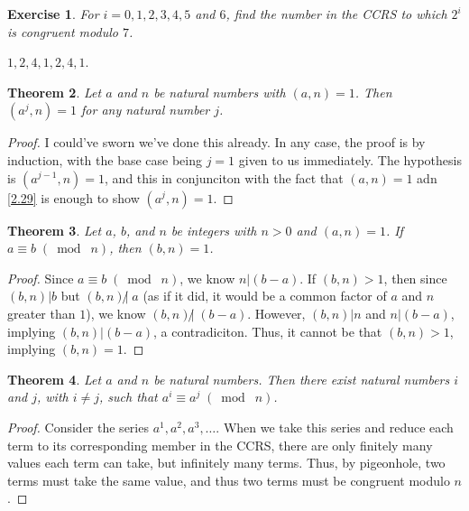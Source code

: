 \documentclass{article}
\newtheorem{thm}{Theorem}[section]
\newtheorem{ex}[thm]{Exercise}
\numberwithin{equation}{thm}
\providecommand{\gmod}[1]{\; (\bmod \; #1)}
\begin{document}
\begin{ex} \label{4.1}
  For $i = 0, 1, 2, 3, 4, 5$ and $6$, find the number in the CCRS to which $2^i$ is congruent modulo $7$.
\end{ex}

$1, 2, 4, 1, 2, 4, 1$.



\begin{thm} \label{4.2}
  Let $a$ and $n$ be natural numbers with $(a, n) = 1$. Then $(a^j, n) = 1$ for any natural number $j$.
\end{thm}

\begin{proof}
  I could've sworn we've done this already. In any case, the proof is by induction, with the base case being $j=1$ given to us immediately. The hypothesis is $(a^{j-1},n) = 1$, and this in conjunciton with the fact that $(a, n) = 1$ adn \ref{2.29} is enough to show $(a^j, n) = 1$.
\end{proof}



\begin{thm} \label{4.3}
  Let $a$, $b$, and $n$ be integers with $n > 0$ and $(a, n) = 1$. If $a \equiv b \gmod n$, then $(b, n) = 1$.
\end{thm}

\begin{proof}
  Since $a \equiv b \gmod n$, we know $n | (b - a)$. If $(b, n) > 1$, then since $(b, n) | b$ but $(b, n) \not | \; a$ (as if it did, it would be a common factor of $a$ and $n$ greater than $1$), we know $(b, n) \not | \; (b-a)$. However, $(b, n) | n$ and $n | (b-a)$, implying $(b, n) | (b-a)$, a contradiciton. Thus, it cannot be that $(b, n) > 1$, implying $(b, n) = 1$.
\end{proof}



\begin{thm} \label{4.4}
  Let $a$ and $n$ be natural numbers. Then there exist natural numbers $i$ and $j$, with $i \neq j$, such that $a^i \equiv a^j \gmod n$.
\end{thm}

\begin{proof}
  Consider the series $a^1, a^2, a^3, \ldots$. When we take this series and reduce each term to its corresponding member in the CCRS, there are only finitely many values each term can take, but infinitely many terms. Thus, by pigeonhole, two terms must take the same value, and thus two terms must be congruent modulo $n$.
\end{proof}
\end{document}
